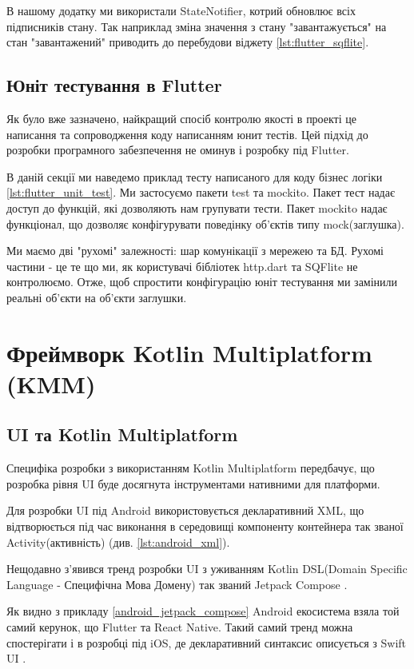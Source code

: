 В нашому додатку ми використали StateNotifier, котрий обновлює всіх підписників стану.
Так наприклад зміна значення з стану "завантажується" на стан "завантажений" приводить до перебудови віджету \ref{lst:flutter_sqflite}.

\subsection{Юніт тестування в Flutter}
\label{sec:flutter_unit_testing_app}
Як було вже зазначено, найкращий спосіб контролю якості в проекті це написання та сопроводження коду написанням юнит тестів.
Цей підхід до розробки програмного забезпечення не оминув і розробку під Flutter.

В даній секції ми наведемо приклад тесту написаного для коду бізнес логіки \ref{lst:flutter_unit_test}.
Ми застосуємо пакети test та mockito.
Пакет тест надає доступ до функцій, які дозволяють нам групувати тести.
Пакет mockito надає функціонал, що дозволяє конфігурувати поведінку об'єктів типу mock(заглушка).

Ми маємо дві "рухомі" залежності: шар комунікації з мережею та БД.
Рухомі частини - це те що ми, як користувачі бібліотек http.dart та SQFlite не контролюємо.
Отже, щоб спростити конфігурацію юніт тестування ми замінили реальні об'єкти на об'єкти заглушки.


\section{Фреймворк Kotlin Multiplatform (KMM)}
\label{sec:kmm}

\subsection{UI та Kotlin Multiplatform}
\label{subsec:kmm_ui}
Специфіка розробки з використанням Kotlin Multiplatform передбачує, що розробка рівня UI буде досягнута
інструментами нативними для платформи.

Для розробки UI під Android використовується декларативний XML, що відтворюється під час виконання в середовищі компоненту
контейнера так званої Activity(активність) (див. \ref{lst:android_xml}).

Нещодавно з'явився тренд розробки UI з уживанням
Kotlin DSL(Domain Specific Language - Специфічна Мова Домену) так званий Jetpack Compose \cite{jetpack_compose}.

Як видно з прикладу \ref{android_jetpack_compose} Android екосистема взяла той самий керунок, що Flutter та React Native.
Такий самий тренд можна спостерігати і в розробці під iOS, де декларативний синтаксис описується з Swift UI \cite{swift_ui}.

